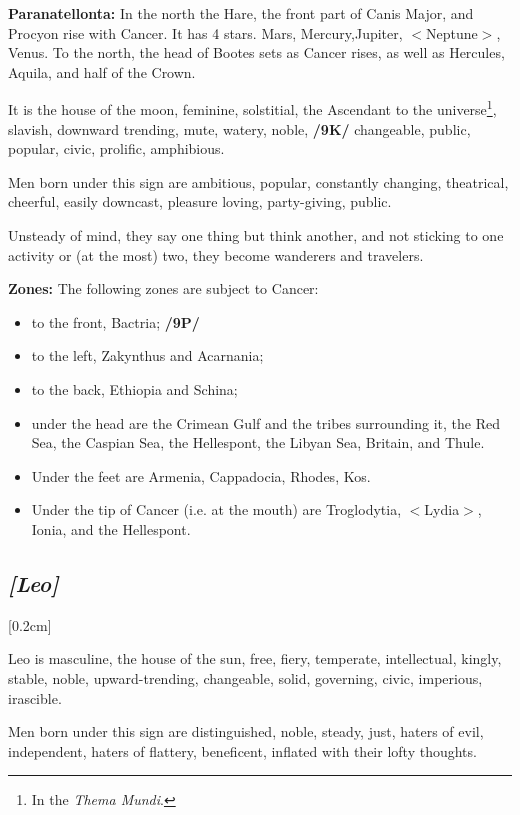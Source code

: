 \textbf{Paranatellonta:} In the north the Hare, the front part of Canis Major, and Procyon rise with Cancer. It has 4 stars. Mars, Mercury,Jupiter, $<$Neptune$>$, Venus. To the north, the head of Bootes sets as Cancer rises, as well as Hercules,
Aquila, and half of the Crown.

It is the house of the moon, feminine, solstitial, the Ascendant to the universe\footnote{In the \textit{Thema Mundi}.}, slavish, downward trending,
mute, watery, noble, \textbf{/9K/} changeable, public, popular, civic, prolific, amphibious. 

Men born under this sign are ambitious, popular, constantly changing, theatrical, cheerful, easily downcast, pleasure loving, party-giving, public. 

Unsteady of mind, they say one thing but think another, and not sticking to one activity or (at the most) two, they become wanderers and travelers.

\textbf{Zones:} The following zones are subject to Cancer: 
\begin{itemize}
\item to the front, Bactria; \textbf{/9P/}
\item to the left, Zakynthus and Acarnania; 
\item to the back, Ethiopia and Schina;
\item under the head are the Crimean Gulf and the tribes
surrounding it, the Red Sea, the Caspian Sea, the Hellespont, the Libyan Sea, Britain, and Thule. 
\item Under the feet are Armenia, Cappadocia, Rhodes, Kos. \item Under the tip of Cancer (i.e. at the mouth) are
Troglodytia, $<$Lydia$>$, Ionia, and the Hellespont.
\end{itemize}

\secbr
\subsection{\textit{[Leo]}}
[0.2cm]

Leo is masculine, the house of the sun, free, fiery, temperate, intellectual, kingly, stable, noble, upward-trending, changeable, solid, governing, civic, imperious, irascible.

Men born under this sign are distinguished, noble, steady, just, haters of evil, independent, haters of flattery, beneficent, inflated with their lofty thoughts. 

